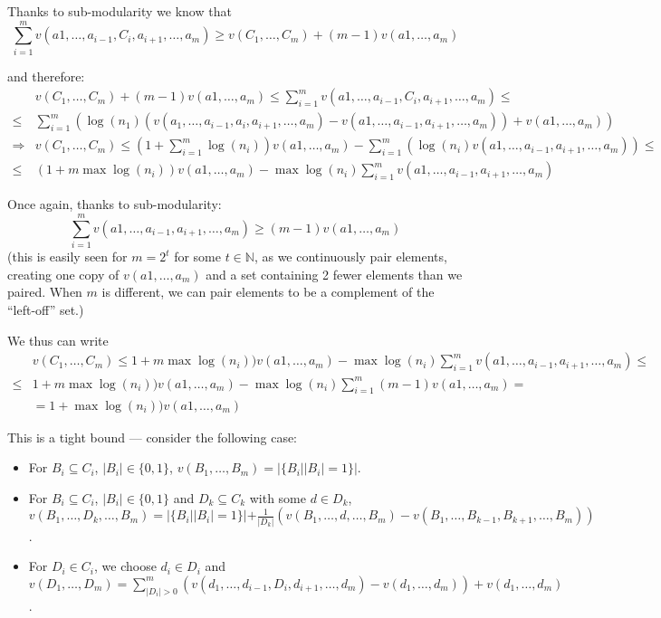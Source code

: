 {Thanks to sub-modularity we know that
$$
\sum_{i=1}^{m}v(a1,\ldots,a_{i-1},C_{i},a_{i+1},\ldots,a_{m})\geq v(C_{1},\ldots,C_{m})+ (m-1)v(a1,\ldots,a_{m})
$$

and therefore:
\begin{equation*}
\begin{split}
&v(C_{1},\ldots,C_{m})+ (m-1)v(a1,\ldots,a_{m})\leq \sum_{i=1}^{m}v(a1,\ldots,a_{i-1},C_{i},a_{i+1},\ldots,a_{m})\leq \\ \leq&\sum_{i=1}^{m}(\log(n_{1})(v(a_{1},\ldots,a_{i-1},a_{i},a_{i+1},\ldots,a_{m})-v(a1,\ldots,a_{i-1},a_{i+1},\ldots,a_{m}))+v(a1,\ldots,a_{m}))\\
\Rightarrow & v(C_{1},\ldots,C_{m})\leq (1+\sum_{i=1}^{m}\log(n_{i}))v(a1,\ldots,a_{m}) -\sum_{i=1}^{m}(\log(n_{i})v(a1,\ldots,a_{i-1},a_{i+1},\ldots,a_{m}))\leq \\\leq& (1+m\max\log(n_{i}))v(a1,\ldots,a_{m}) -\max\log(n_{i})\sum_{i=1}^{m}v(a1,\ldots,a_{i-1},a_{i+1},\ldots,a_{m})
\end{split}
\end{equation*}

Once again, thanks to sub-modularity:
$$
\sum_{i=1}^{m}v(a1,\ldots,a_{i-1},a_{i+1},\ldots,a_{m})\geq (m-1)v(a1,\ldots,a_{m})
$$
(this is easily seen for $m=2^{t}$ for some $t\in\mathbb{N}$, as we continuously pair elements, creating one copy of  $v(a1,\ldots,a_{m})$ and a set containing 2 fewer elements than we paired. When $m$ is different, we can pair elements to be a complement of the ``left-off'' set.)

We thus can write
\begin{equation*}
\begin{split}
&v(C_{1},\ldots,C_{m})\leq 1+m\max\log(n_{i}))v(a1,\ldots,a_{m}) -\max\log(n_{i})\sum_{i=1}^{m}v(a1,\ldots,a_{i-1},a_{i+1},\ldots,a_{m}) \leq \\ \leq &1+m\max\log(n_{i}))v(a1,\ldots,a_{m}) -\max\log(n_{i})\sum_{i=1}^{m}(m-1)v(a1,\ldots,a_{m})=\\&=1+\max\log(n_{i}))v(a1,\ldots,a_{m})
\end{split}
\end{equation*}

This is a tight bound --- consider the following case:
\begin{itemize}
\item For $B_{i}\subseteq C_{i}$, $|B_{i}|\in \{0,1\}$, $v(B_{1},\ldots,B_{m})=|\{B_{i} | |B_{i}|=1\}|$.
\item For $B_{i}\subseteq C_{i}$, $|B_{i}|\in \{0,1\}$ and $D_{k}\subseteq C_{k}$ with some $d\in D_{k}$, $v(B_{1},\ldots,D_{k},\ldots,B_{m})=|\{B_{i} | |B_{i}|=1\}|+\frac{1}{|D_{k}|}(v(B_{1},\ldots,d,\ldots,B_{m})-v(B_{1},\ldots,B_{k-1},B_{k+1},\ldots,B_{m}))$.
\item For $D_{i}\in C_{i}$, we choose $d_{i}\in D_{i}$ and $v(D_{1},\ldots,D_{m})=\sum_{|D_{i}|>0}^{m}(v(d_{1},\ldots,d_{i-1},D_{i},d_{i+1},\ldots,d_{m}) - v(d_{1},\ldots,d_{m})) + v(d_{1},\ldots,d_{m})$.
\end{itemize}

}
